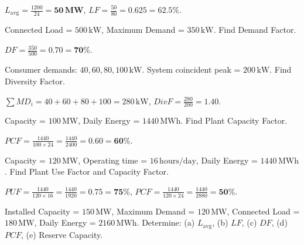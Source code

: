 \documentclass[11pt,a4paper]{article}
\newenvironment{Problem}[1][Numerical Problem]{\begin{tcolorbox}[problembox, title=#1]}{\end{tcolorbox}}
\newenvironment{Solution}[1][Step-by-Step Solution]{\begin{tcolorbox}[solbox, title=#1]}{\end{tcolorbox}}
\begin{document}
\begin{Solution}
$L_{\text{avg}} = \frac{1200}{24} = \mathbf{50\,\text{MW}}$, \qquad $LF = \frac{50}{80} = \mathbf{0.625} = \mathbf{62.5\%}$.
\end{Solution}

\begin{Problem}[Problem 5: Demand Factor Calculation]
Connected Load = $500\,\text{kW}$, Maximum Demand = $350\,\text{kW}$. Find Demand Factor.
\end{Problem}

\begin{Solution}
$DF = \frac{350}{500} = \mathbf{0.70} = \mathbf{70\%}$.
\end{Solution}

\begin{Problem}[Problem 6: Diversity Factor Calculation]
Consumer demands: $40, 60, 80, 100\,\text{kW}$. System coincident peak = $200\,\text{kW}$. Find Diversity Factor.
\end{Problem}

\begin{Solution}
$\sum MD_i = 40+60+80+100 = 280\,\text{kW}$, \qquad $DivF = \frac{280}{200} = \mathbf{1.40}$.
\end{Solution}

\begin{Problem}[Problem 7: Plant Capacity Factor Calculation]
Capacity = $100\,\text{MW}$, Daily Energy = $1440\,\text{MWh}$. Find Plant Capacity Factor.
\end{Problem}

\begin{Solution}
$PCF = \frac{1440}{100 \times 24} = \frac{1440}{2400} = \mathbf{0.60} = \mathbf{60\%}$.
\end{Solution}

\begin{Problem}[Problem 8: Plant Use Factor with Operating Outages]
Capacity = $120\,\text{MW}$, Operating time = $16\,\text{hours/day}$, Daily Energy = $1440\,\text{MWh}$. Find Plant Use Factor and Capacity Factor.
\end{Problem}

\begin{Solution}
$PUF = \frac{1440}{120 \times 16} = \frac{1440}{1920} = \mathbf{0.75} = \mathbf{75\%}$, \qquad $PCF = \frac{1440}{120 \times 24} = \frac{1440}{2880} = \mathbf{50\%}$.
\end{Solution}

\begin{Problem}[Problem 9: Multi-Parameter Station Analysis]
Installed Capacity = $150\,\text{MW}$, Maximum Demand = $120\,\text{MW}$, Connected Load = $180\,\text{MW}$, Daily Energy = $2160\,\text{MWh}$. Determine: (a) $L_{\text{avg}}$, (b) $LF$, (c) $DF$, (d) $PCF$, (e) Reserve Capacity.
\end{Problem}
\end{document}
